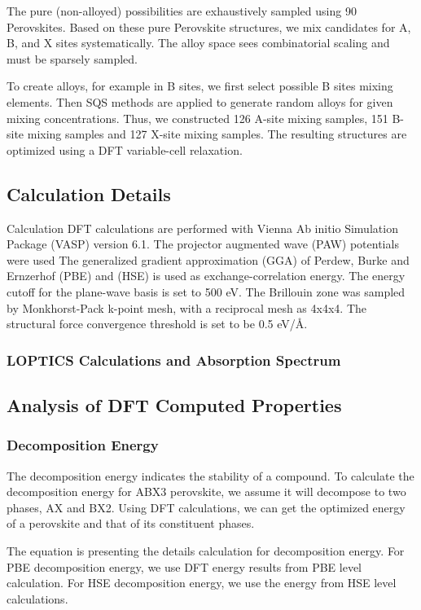 \documentclass[twoside, twocolumn, 9pt, draft]{article}
\begin{document}
The pure (non-alloyed) possibilities are exhaustively sampled using 90
Perovskites. Based on these pure Perovskite structures, we mix
candidates for A, B, and X sites systematically. The alloy space sees
combinatorial scaling and must be sparsely sampled.

To create alloys, for example in B sites, we first select possible B
sites mixing elements.  Then SQS methods are applied to generate
random alloys for given mixing concentrations. Thus, we constructed
126 A-site mixing samples, 151 B-site mixing samples and 127 X-site
mixing samples. The resulting structures are optimized using a DFT
variable-cell relaxation.

\subsection*{Calculation Details}
\label{sec:org098058e}
Calculation DFT calculations are performed with Vienna Ab initio
Simulation Package (VASP) version 6.1. The projector augmented wave
(PAW) potentials were used The generalized gradient approximation (GGA)
of Perdew, Burke and Ernzerhof (PBE) and (HSE) is used as
exchange-correlation energy. The energy cutoff for the plane-wave basis
is set to 500 eV. The Brillouin zone was sampled by Monkhorst-Pack
k-point mesh, with a reciprocal mesh as 4x4x4. The structural force
convergence threshold is set to be 0.5 eV/Å.

\subsubsection*{LOPTICS Calculations and Absorption Spectrum}
\label{sec:org61f5185}

\subsection*{Analysis of DFT Computed Properties}
\label{sec:org024fa3b}
\subsubsection*{Decomposition Energy}
\label{sec:org409d196}
The decomposition energy indicates the stability of a compound. To
calculate the decomposition energy for ABX3 perovskite, we assume it
will decompose to two phases, AX and BX2. Using DFT calculations, we
can get the optimized energy of a perovskite and that of its
constituent phases.

The equation is presenting the details calculation for decomposition
energy. For PBE decomposition energy, we use DFT energy results from
PBE level calculation. For HSE decomposition energy, we use the energy
from HSE level calculations.
\end{document}
